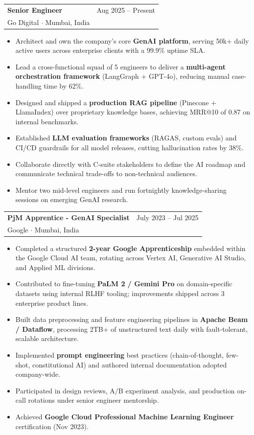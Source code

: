 \documentclass[11pt, a4paper]{article}
\makeatletter
\newcommand{\jobentry}[5]{%
    \vspace{4pt}
    \noindent
    \begin{tabularx}{\textwidth}{@{}X r@{}}
        {\bfseries\color{darkgray} #3} & {\small\color{midgray} #4} \\
        {\color{accentblue} #1} \textnormal{{\small\color{midgray}$\cdot$ #2}} & \\
    \end{tabularx}
    \vspace{2pt}
    \begin{itemize}[leftmargin=1.2em, itemsep=1pt, parsep=0pt, topsep=2pt]
        #5
    \end{itemize}
    \vspace{2pt}
}
\makeatother
\begin{document}
\jobentry
    {Go Digital}
    {Mumbai, India}
    {Senior Engineer}
    {Aug 2025 -- Present}
    {
        \item Architect and own the company's core \textbf{GenAI platform}, serving 50k+ daily active users across enterprise clients with a 99.9\% uptime SLA.
        \item Lead a cross-functional squad of 5 engineers to deliver a \textbf{multi-agent orchestration framework} (LangGraph + GPT-4o), reducing manual case-handling time by 62\%.
        \item Designed and shipped a \textbf{production RAG pipeline} (Pinecone + LlamaIndex) over proprietary knowledge bases, achieving MRR@10 of 0.87 on internal benchmarks.
        \item Established \textbf{LLM evaluation frameworks} (RAGAS, custom evals) and CI/CD guardrails for all model releases, cutting hallucination rates by 38\%.
        \item Collaborate directly with C-suite stakeholders to define the AI roadmap and communicate technical trade-offs to non-technical audiences.
        \item Mentor two mid-level engineers and run fortnightly knowledge-sharing sessions on emerging GenAI research.
    }

\jobentry
    {Google}
    {Mumbai, India}
    {PjM Apprentice - GenAI Specialist}
    {July 2023 -- Jul 2025}
    {
        \item Completed a structured \textbf{2-year Google Apprenticeship} embedded within the Google Cloud AI team, rotating across Vertex AI, Generative AI Studio, and Applied ML divisions.
        \item Contributed to fine-tuning \textbf{PaLM 2 / Gemini Pro} on domain-specific datasets using internal RLHF tooling; improvements shipped across 3 enterprise product lines.
        \item Built data preprocessing and feature engineering pipelines in \textbf{Apache Beam / Dataflow}, processing 2TB+ of unstructured text daily with fault-tolerant, scalable architecture.
        \item Implemented \textbf{prompt engineering} best practices (chain-of-thought, few-shot, constitutional AI) and authored internal documentation adopted company-wide.
        \item Participated in design reviews, A/B experiment analysis, and production on-call rotations under senior engineer mentorship.
        \item Achieved \textbf{Google Cloud Professional Machine Learning Engineer} certification (Nov 2023).
    }
\end{document}
